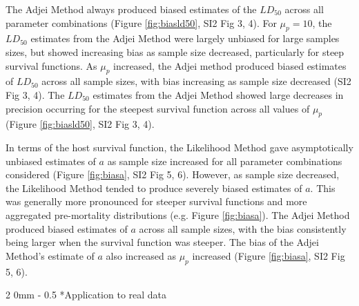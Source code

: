 \documentclass[12pt, a4paper]{article}
\makeatletter
\renewcommand{\subsection}{\@startsection
{subsection}%
{2}%
{0mm}%
{-\baselineskip}%
{0.5\baselineskip}%
{\normalfont\bf}} %
\makeatother
\begin{document}
The Adjei Method
always produced biased estimates of the $LD_{50}$ across all parameter combinations (Figure \ref{fig:biasld50}, SI2 Fig 3, 4).  For $\mu_p = 10$, the $LD_{50}$
estimates from the Adjei Method were largely unbiased for large samples sizes,
but showed increasing bias as sample size decreased, particularly for steep
survival functions.  As $\mu_p$ increased, the Adjei method
produced biased estimates of $LD_{50}$ across all sample sizes, with bias
increasing as sample size decreased (SI2 Fig 3, 4). The $LD_{50}$ estimates from the Adjei
Method showed large decreases in precision occurring
for the steepest survival function across all values of $\mu_p$ (Figure \ref{fig:biasld50}, SI2 Fig 3, 4).







In terms of the host survival function, the Likelihood Method gave
asymptotically unbiased estimates of $a$ as sample size increased for
all parameter combinations considered (Figure \ref{fig:biasa}, SI2 Fig 5, 6).  However, as sample size decreased, the
Likelihood Method tended to produce severely biased estimates of $a$.
This was generally more pronounced for steeper survival functions and more
aggregated pre-mortality distributions (e.g. Figure \ref{fig:biasa}).  The Adjei Method produced
biased estimates of $a$ across all sample sizes, with the bias
consistently being larger when the survival function was steeper. The bias of
the Adjei Method's estimate of $a$ also increased as $\mu_p$ increased (Figure \ref{fig:biasa}, SI2 Fig 5, 6).

\subsection*{Application to real data}
\end{document}
